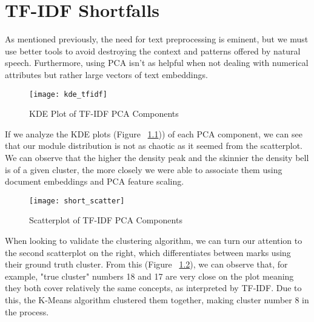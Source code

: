 \chapter{TF-IDF Shortfalls}
\label{ch:tfidfshortfalls}

As mentioned previously, the need for text preprocessing is eminent, but we must use better tools to avoid destroying the context and patterns offered by natural speech. Furthermore, using PCA isn't as helpful when not dealing with numerical attributes but rather large vectors of text embeddings.

\begin{figure}
  \centering
  \texttt{[image: kde\_tfidf]}
  \caption{KDE Plot of TF-IDF PCA Components}
  \label{fig:tfidf_kde}
\end{figure}

If we analyze the KDE plots (Figure ~\ref{fig:tfidf_kde})) of each PCA component, we can see that our module distribution is not as chaotic as it seemed from the scatterplot. We can observe that the higher the density peak and the skinnier the density bell is of a given cluster, the more closely we were able to associate them using document embeddings and PCA feature scaling.

\begin{figure}
  \centering
  \texttt{[image: short\_scatter]}
  \caption{Scatterplot of TF-IDF PCA Components}
  \label{fig:tfidf_scatter}
\end{figure}

When looking to validate the clustering algorithm, we can turn our attention to the second scatterplot on the right, which differentiates between marks using their ground truth cluster. From this (Figure ~\ref{fig:tfidf_scatter}), we can observe that, for example, "true cluster" numbers 18 and 17 are very close on the plot meaning they both cover relatively the same concepts, as interpreted by TF-IDF. Due to this, the K-Means algorithm clustered them together, making cluster number 8 in the process.
